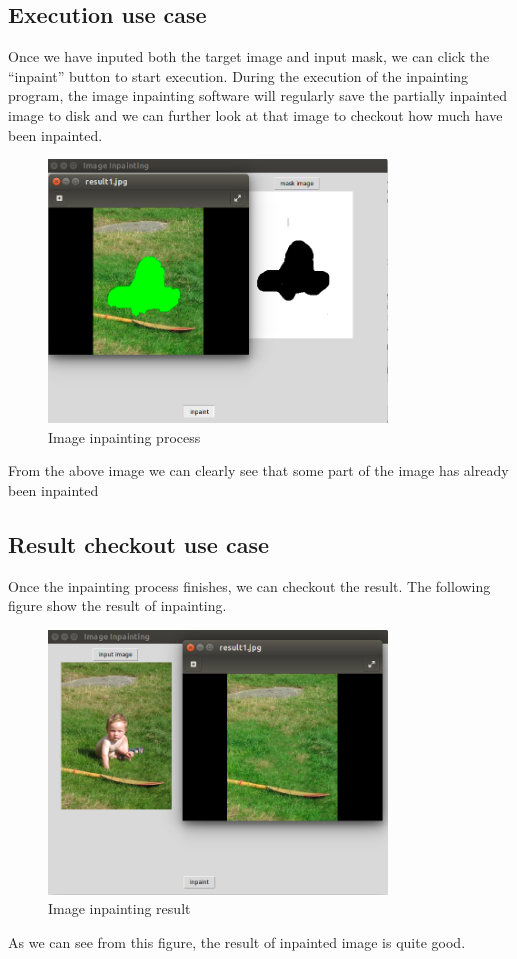 \subsection{Execution use case}
Once we have inputed both the target image and input mask, we can click the ``inpaint'' button to start execution. During the execution of the inpainting program, the image inpainting software will regularly save the partially inpainted image to disk and we can further look at that image to checkout how much have been inpainted.
\begin{figure}[H]
\centering
\includegraphics[width=9cm]{ex_ex.png}
\caption{Image inpainting process}
\end{figure}
From the above image we can clearly see that some part of the image has already been inpainted
\subsection{Result checkout use case}
Once the inpainting process finishes, we can checkout the result. The following figure show the result of inpainting.
\begin{figure}[H]
\centering
\includegraphics[width=9cm]{ex_res.png}
\caption{Image inpainting result}
\end{figure}
As we can see from this figure, the result of inpainted image is quite good.

